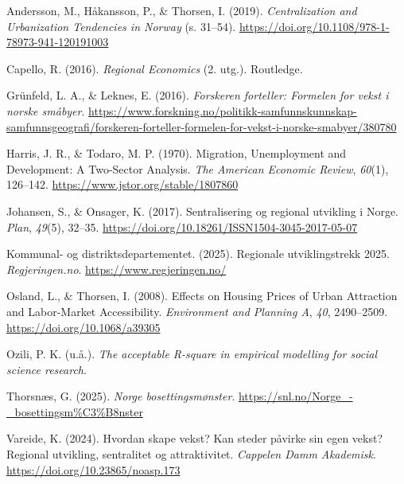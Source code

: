 \documentclass[
  norsk,
  letterpaper,
  DIV=11,
  numbers=noendperiod]{scrartcl}
\newlength{\cslhangindent}
\newenvironment{CSLReferences}[2] %
 {\begin{list}{}{%
  \setlength{\itemindent}{0pt}
  \setlength{\leftmargin}{0pt}
  \setlength{\parsep}{0pt}
  \ifodd #1
   \setlength{\leftmargin}{\cslhangindent}
   \setlength{\itemindent}{-1\cslhangindent}
  \fi
  \setlength{\itemsep}{#2\baselineskip}}}
 {\end{list}}
\begin{document}
\label{refs}
\begin{CSLReferences}{1}{0}
Andersson, M., Håkansson, P., \& Thorsen, I. (2019).
\emph{Centralization and Urbanization Tendencies in Norway} (s. 31--54).
\url{https://doi.org/10.1108/978-1-78973-941-120191003}

Capello, R. (2016). \emph{Regional Economics} (2. utg.). Routledge.

Grünfeld, L. A., \& Leknes, E. (2016). \emph{Forskeren forteller:
Formelen for vekst i norske småbyer}.
\url{https://www.forskning.no/politikk-samfunnskunnskap-samfunnsgeografi/forskeren-forteller-formelen-for-vekst-i-norske-smabyer/380780}

Harris, J. R., \& Todaro, M. P. (1970). Migration, Unemployment and
Development: A Two-Sector Analysis. \emph{The American Economic Review},
\emph{60}(1), 126--142. \url{https://www.jstor.org/stable/1807860}

Johansen, S., \& Onsager, K. (2017). Sentralisering og regional
utvikling i Norge. \emph{Plan}, \emph{49}(5), 32--35.
\url{https://doi.org/10.18261/ISSN1504-3045-2017-05-07}

Kommunal- og distriktsdepartementet. (2025). Regionale utviklingstrekk
2025. \emph{Regjeringen.no}. \url{https://www.regjeringen.no/}

Osland, L., \& Thorsen, I. (2008). Effects on Housing Prices of Urban
Attraction and Labor-Market Accessibility. \emph{Environment and
Planning A}, \emph{40}, 2490--2509. \url{https://doi.org/10.1068/a39305}

Ozili, P. K. (u.å.). \emph{The acceptable R-square in empirical
modelling for social science research}.

Thorsnæs, G. (2025). \emph{Norge {\textendash} bosettingsmønster}.
\url{https://snl.no/Norge_-_bosettingsm\%C3\%B8nster}

Vareide, K. (2024). Hvordan skape vekst? Kan steder påvirke sin egen
vekst? Regional utvikling, sentralitet og attraktivitet. \emph{Cappelen
Damm Akademisk}. \url{https://doi.org/10.23865/noasp.173}

\end{CSLReferences}
\end{document}
